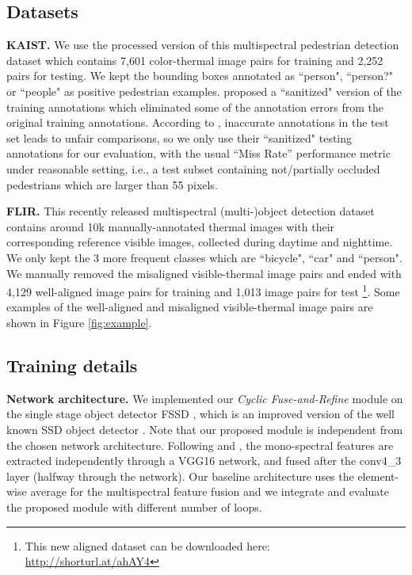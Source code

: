 \documentclass{article}
\begin{document}
\subsection{Datasets}
 
\noindent
\textbf{KAIST.} We use the processed version of this multispectral pedestrian detection dataset which contains 7,601 color-thermal image pairs for training and 2,252 pairs for testing. We kept the bounding boxes annotated as ``person", ``person?" or ``people" as positive pedestrian examples. \cite{MSDS} proposed a ``sanitized" version of the training annotations which eliminated some of the annotation errors from the original training annotations.
According to \cite{TestAnno}, inaccurate annotations in the test set leads to unfair comparisons, so we only use their ``sanitized" testing annotations for our evaluation, with the usual ``Miss Rate'' performance metric under reasonable setting, i.e., a test subset containing not/partially occluded pedestrians which are larger than 55 pixels.

\noindent
\textbf{FLIR.} This recently released multispectral (multi-)object detection dataset contains around 10k manually-annotated thermal images with their corresponding reference visible images, collected during daytime and nighttime. We only kept the 3 more frequent classes which are ``bicycle", ``car" and ``person". We manually removed the misaligned visible-thermal image pairs and ended with 4,129 well-aligned image pairs for training and 1,013 image pairs for test \footnote{This new aligned dataset can be downloaded here: \url{http://shorturl.at/ahAY4}}. Some examples of the well-aligned and misaligned visible-thermal image pairs are shown in Figure \ref{fig:example}.

\subsection{Training details}

\noindent
\textbf{Network architecture.} We implemented our \textit{Cyclic Fuse-and-Refine} module on the single stage object detector FSSD \cite{FSSD}, which is an improved version of the well known SSD object detector \cite{SSD}. Note that our proposed module is independent from the chosen network architecture. Following \cite{TestAnno} and \cite{Illumination-aware-li}, the mono-spectral features are extracted independently through a VGG16 \cite{VGG} network, and fused after the conv4\_3 layer (halfway through the network). Our baseline architecture uses the element-wise average for the multispectral feature fusion and we integrate and evaluate the proposed module with different number of loops.
\end{document}
